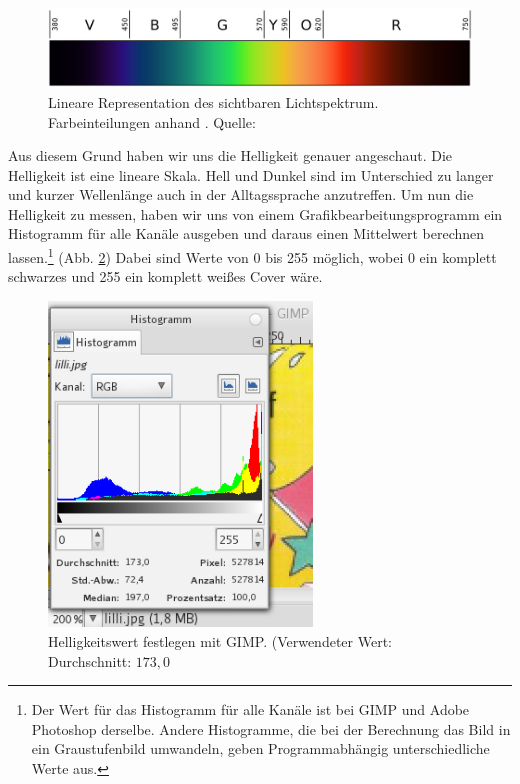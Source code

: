 \begin{figure} \center \includegraphics{grafiken/spectrum.png} \caption[Sichtbares Lichtspektrum]{Lineare Representation des sichtbaren Lichtspektrum. Farbeinteilungen anhand \cite[3]{Bruno2006}. Quelle: \cite[][\href{http://en.wikipe/wiki/File:Linear_visible_spectrum.svg}{\texttt{/wiki/File:Linear\_visible\_spectrum.svg}}]{en.wiki}} \label{spectrum} \end{figure}

Aus diesem Grund haben wir uns die Helligkeit genauer angeschaut. Die
Helligkeit ist eine lineare Skala. Hell und Dunkel sind im Unterschied
zu langer und kurzer Wellenlänge auch in der Alltagssprache anzutreffen.
Um nun die Helligkeit zu messen, haben wir uns von einem
Grafikbearbeitungsprogramm ein Histogramm für alle Kanäle ausgeben und
daraus einen Mittelwert berechnen
lassen.\footnote{Der Wert für das Histogramm für alle Kanäle ist bei GIMP und Adobe Photoshop derselbe. Andere Histogramme, die bei der Berechnung das Bild in ein Graustufenbild umwandeln, geben Programmabhängig unterschiedliche Werte aus.}
(Abb. \ref{histogramm}) Dabei sind Werte von 0 bis 255 möglich, wobei 0
ein komplett schwarzes und 255 ein komplett weißes Cover wäre.

\begin{figure} \center \includegraphics[width=7cm]{grafiken/hist.png} \caption[Helligkeitswert festlegen mit GIMP]{Helligkeitswert festlegen mit GIMP. (Verwendeter Wert: Durchschnitt: $173{,}0$} \label{histogramm} \end{figure}

